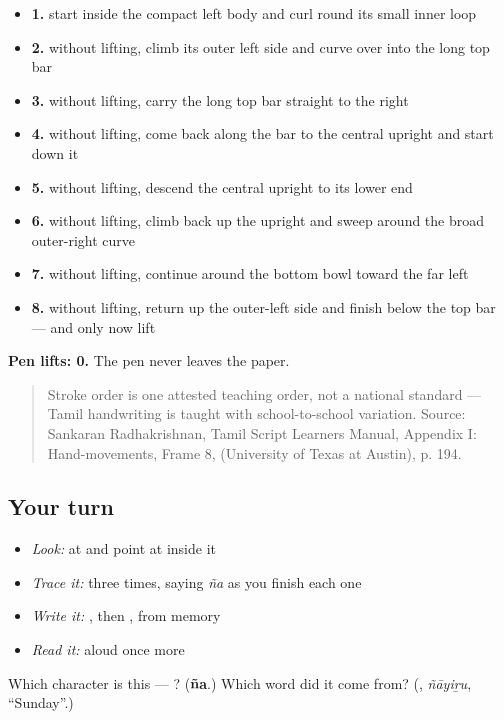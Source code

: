 \begin{itemize}
\raggedright
  \item \textbf{1.} start inside the compact left body and curl round its small inner loop
  \item \textbf{2.} without lifting, climb its outer left side and curve over into the long top bar
  \item \textbf{3.} without lifting, carry the long top bar straight to the right
  \item \textbf{4.} without lifting, come back along the bar to the central upright and start down it
  \item \textbf{5.} without lifting, descend the central upright to its lower end
  \item \textbf{6.} without lifting, climb back up the upright and sweep around the broad outer-right curve
  \item \textbf{7.} without lifting, continue around the bottom bowl toward the far left
  \item \textbf{8.} without lifting, return up the outer-left side and finish below the top bar — and only now lift
\end{itemize}

\textbf{Pen lifts: 0.} The pen never leaves the paper.

\begin{quote}
Stroke order is one attested teaching order, not a national standard — Tamil handwriting is taught with school-to-school variation. Source: Sankaran Radhakrishnan, Tamil Script Learners Manual, Appendix I: Hand-movements, Frame 8,  (University of Texas at Austin), p. 194.
\end{quote}

\subsection*{Your turn}
\begin{itemize}
\raggedright
  \item \emph{Look:} at \textbf{} and point at  inside it
  \item \emph{Trace it:}  three times, saying \emph{ña} as you finish each one
  \item \emph{Write it:} , then , from memory
  \item \emph{Read it:} \textbf{} aloud once more
\end{itemize}

\begin{tcolorbox}[breakable,colback=teal!4,colframe=teal!35!black,title={Before you move on}]
Which character is this — ? (\textbf{ña}.) Which word did it come from? (\textbf{}, \emph{ñāyiṟu}, \textquotedblleft{}Sunday\textquotedblright{}.)
\end{tcolorbox}
